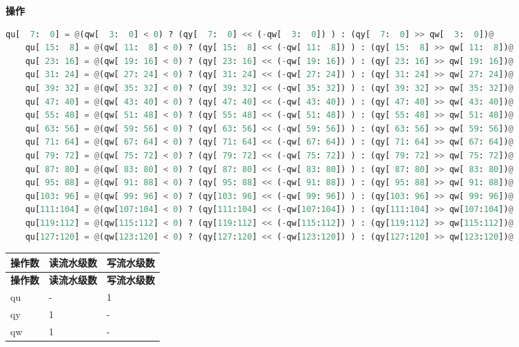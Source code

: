 \textbf{操作}\\
\begin{lstlisting}[language=Python, escapechar=@]
    qu[  7:  0] = @(qw[  3:  0] < 0) ? (qy[  7:  0] << (-qw[  3:  0]) ) : (qy[  7:  0] >> qw[  3:  0])@
    qu[ 15:  8] = @(qw[ 11:  8] < 0) ? (qy[ 15:  8] << (-qw[ 11:  8]) ) : (qy[ 15:  8] >> qw[ 11:  8])@
    qu[ 23: 16] = @(qw[ 19: 16] < 0) ? (qy[ 23: 16] << (-qw[ 19: 16]) ) : (qy[ 23: 16] >> qw[ 19: 16])@
    qu[ 31: 24] = @(qw[ 27: 24] < 0) ? (qy[ 31: 24] << (-qw[ 27: 24]) ) : (qy[ 31: 24] >> qw[ 27: 24])@
    qu[ 39: 32] = @(qw[ 35: 32] < 0) ? (qy[ 39: 32] << (-qw[ 35: 32]) ) : (qy[ 39: 32] >> qw[ 35: 32])@
    qu[ 47: 40] = @(qw[ 43: 40] < 0) ? (qy[ 47: 40] << (-qw[ 43: 40]) ) : (qy[ 47: 40] >> qw[ 43: 40])@
    qu[ 55: 48] = @(qw[ 51: 48] < 0) ? (qy[ 55: 48] << (-qw[ 51: 48]) ) : (qy[ 55: 48] >> qw[ 51: 48])@
    qu[ 63: 56] = @(qw[ 59: 56] < 0) ? (qy[ 63: 56] << (-qw[ 59: 56]) ) : (qy[ 63: 56] >> qw[ 59: 56])@
    qu[ 71: 64] = @(qw[ 67: 64] < 0) ? (qy[ 71: 64] << (-qw[ 67: 64]) ) : (qy[ 71: 64] >> qw[ 67: 64])@
    qu[ 79: 72] = @(qw[ 75: 72] < 0) ? (qy[ 79: 72] << (-qw[ 75: 72]) ) : (qy[ 79: 72] >> qw[ 75: 72])@
    qu[ 87: 80] = @(qw[ 83: 80] < 0) ? (qy[ 87: 80] << (-qw[ 83: 80]) ) : (qy[ 87: 80] >> qw[ 83: 80])@
    qu[ 95: 88] = @(qw[ 91: 88] < 0) ? (qy[ 95: 88] << (-qw[ 91: 88]) ) : (qy[ 95: 88] >> qw[ 91: 88])@
    qu[103: 96] = @(qw[ 99: 96] < 0) ? (qy[103: 96] << (-qw[ 99: 96]) ) : (qy[103: 96] >> qw[ 99: 96])@
    qu[111:104] = @(qw[107:104] < 0) ? (qy[111:104] << (-qw[107:104]) ) : (qy[111:104] >> qw[107:104])@
    qu[119:112] = @(qw[115:112] < 0) ? (qy[119:112] << (-qw[115:112]) ) : (qy[119:112] >> qw[115:112])@
    qu[127:120] = @(qw[123:120] < 0) ? (qy[127:120] << (-qw[123:120]) ) : (qy[127:120] >> qw[123:120])@
\end{lstlisting}

\begin{longtable}[c]{|l|l|l|}
    \hline
    \rowcolor{lightgray}
    \textbf{操作数} & \textbf{读流水级数} & \textbf{写流水级数} \\\hline
    \endfirsthead
    \rowcolor{lightgray}
     \textbf{操作数} & \textbf{读流水级数} & \textbf{写流水级数} \\\hline
    \endhead
    \endfoot

  qu & - & 1 \\\hline
  qy & 1 & - \\\hline
  qw & 1 & - \\\hline

\end{longtable}


